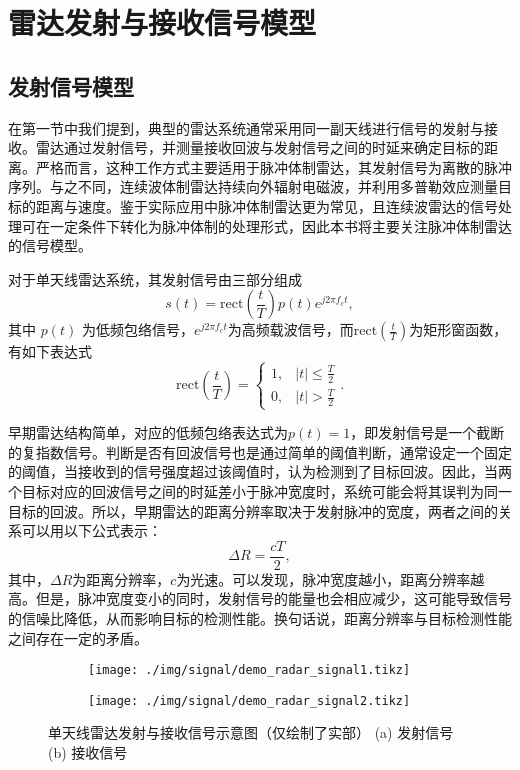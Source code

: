 \chapter{雷达发射与接收信号模型}

\section{发射信号模型}\label{sec_radar_signal_model}
在第一节中我们提到，典型的雷达系统通常采用同一副天线进行信号的发射与接收。雷达通过发射信号，并测量接收回波与发射信号之间的时延来确定目标的距离。严格而言，这种工作方式主要适用于脉冲体制雷达，其发射信号为离散的脉冲序列。与之不同，连续波体制雷达持续向外辐射电磁波，并利用多普勒效应测量目标的距离与速度。鉴于实际应用中脉冲体制雷达更为常见，且连续波雷达的信号处理可在一定条件下转化为脉冲体制的处理形式，因此本书将主要关注脉冲体制雷达的信号模型。

对于单天线雷达系统，其发射信号由三部分组成
\[
    s(t) = \text{rect}\left(\frac{t}{T}\right) p(t) e^{j 2 \pi f_c t},
\]
其中 \( p(t) \) 为低频包络信号，\( e^{j 2 \pi f_c t} \)为高频载波信号，而\( \text{rect}\left(\frac{t}{T}\right) \)为矩形窗函数，有如下表达式
\[
    \text{rect}\left(\frac{t}{T}\right) =
    \begin{cases}
        1, & |t| \leq \frac{T}{2} \\
        0, & |t| > \frac{T}{2}
    \end{cases}.
\]

早期雷达结构简单，对应的低频包络表达式为\( p(t) = 1 \)，即发射信号是一个截断的复指数信号。判断是否有回波信号也是通过简单的阈值判断，通常设定一个固定的阈值，当接收到的信号强度超过该阈值时，认为检测到了目标回波。因此，当两个目标对应的回波信号之间的时延差小于脉冲宽度时，系统可能会将其误判为同一目标的回波。所以，早期雷达的距离分辨率取决于发射脉冲的宽度，两者之间的关系可以用以下公式表示：
\[
    \Delta R = \frac{cT}{2},
\]
其中，\( \Delta R \)为距离分辨率，\( c \)为光速。可以发现，脉冲宽度越小，距离分辨率越高。但是，脉冲宽度变小的同时，发射信号的能量也会相应减少，这可能导致信号的信噪比降低，从而影响目标的检测性能。换句话说，距离分辨率与目标检测性能之间存在一定的矛盾。

\begin{figure}[htb!]
    \centering
    \begin{subfigure}{.45\textwidth}
        \centering
        \texttt{[image: ./img/signal/demo\_radar\_signal1.tikz]}
        \caption{}
        \label{fig_radar_signal_1_1}
    \end{subfigure}
    \begin{subfigure}{.45\textwidth}
        \centering
        \texttt{[image: ./img/signal/demo\_radar\_signal2.tikz]}
        \caption{}
        \label{fig_radar_signal_1_2}
    \end{subfigure}
    \caption{单天线雷达发射与接收信号示意图（仅绘制了实部） (a) 发射信号 (b) 接收信号}
    \label{fig_radar_signal_1}
\end{figure}


